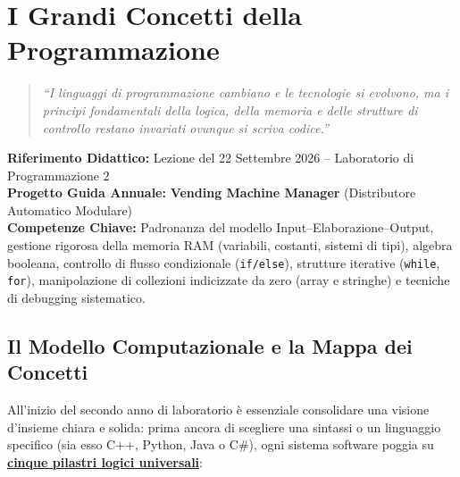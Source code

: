 \chapter{I Grandi Concetti della Programmazione}
\label{chap:grandi-concetti}

\begin{quote}
\itshape
\small
``I linguaggi di programmazione cambiano e le tecnologie si evolvono, ma i principi fondamentali della logica, della memoria e delle strutture di controllo restano invariati ovunque si scriva codice.''
\end{quote}
\vspace{1em}

\noindent\textbf{Riferimento Didattico:} Lezione del 22 Settembre 2026 -- Laboratorio di Programmazione 2\\
\textbf{Progetto Guida Annuale:} \textbf{\color{PiazzaPrimary}Vending Machine Manager} (Distributore Automatico Modulare)\\
\textbf{Competenze Chiave:} Padronanza del modello Input--Elaborazione--Output, gestione rigorosa della memoria RAM (variabili, costanti, sistemi di tipi), algebra booleana, controllo di flusso condizionale (\texttt{if/else}), strutture iterative (\texttt{while}, \texttt{for}), manipolazione di collezioni indicizzate da zero (array e stringhe) e tecniche di debugging sistematico.

\vspace{1.5em}

\section{Il Modello Computazionale e la Mappa dei Concetti}

All'inizio del secondo anno di laboratorio è essenziale consolidare una visione d'insieme chiara e solida: prima ancora di scegliere una sintassi o un linguaggio specifico (sia esso C++, Python, Java o C\#), ogni sistema software poggia su \textbf{\underline{cinque pilastri logici universali}}:

